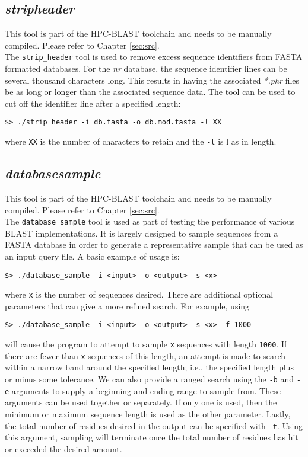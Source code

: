 \documentclass[10pt]{article}
\begin{document}
\subsection{\emph{strip\textunderscore header}} \label{sssec:stripheader}

 This tool is part of the HPC-BLAST toolchain and needs to be manually compiled.  Please refer to Chapter \ref{sec:src}.\\

The \verb^strip_header^ tool is used to remove excess sequence identifiers from FASTA formatted databases.  For the \emph{nr} database, the sequence identifier lines can be several thousand characters long.  This results in having the
associated \emph{*.phr} files be as long or longer than the associated sequence data.  The tool can be used to cut off the identifier line after a specified length:
\begin{verbatim}
$> ./strip_header -i db.fasta -o db.mod.fasta -l XX
\end{verbatim}
\noindent where \verb^XX^ is the number of characters to retain and the \verb^-l^ is l as in length.

\subsection{\emph{database\textunderscore sample}} \label{ssec:datadist}

 This tool is part of the HPC-BLAST toolchain and needs to be manually compiled.  Please refer to Chapter \ref{sec:src}.\\

The \verb^database_sample^ tool is used as part of testing the performance of various BLAST implementations.  It is largely designed to sample sequences from a FASTA database in order to generate a representative sample that
can be used as an input query file.  A basic example of usage is:
\begin{verbatim}
$> ./database_sample -i <input> -o <output> -s <x>
\end{verbatim}
\noindent where \verb^x^ is the number of sequences desired.  There are additional optional parameters that can give a more refined search.  For example, using
\begin{verbatim}
$> ./database_sample -i <input> -o <output> -s <x> -f 1000
\end{verbatim}
\noindent will cause the program to attempt to sample \verb^x^ sequences with length \verb^1000^.  If there are fewer than \verb^x^ sequences of this length, an attempt is made to search within a narrow band around the specified length; i.e., the specified
length plus or minus some tolerance.
We can also provide a ranged search using the \verb^-b^ and \verb^-e^ arguments to supply a beginning and ending range to sample from.  These arguments can be used together or separately.  If only one is used, then the minimum or maximum
sequence length is used as the other parameter.  Lastly, the total number of residues desired in the output can be specified with \verb^-t^.  Using this argument, sampling will terminate once the total number of residues has hit or exceeded the
desired amount.\\
\end{document}
